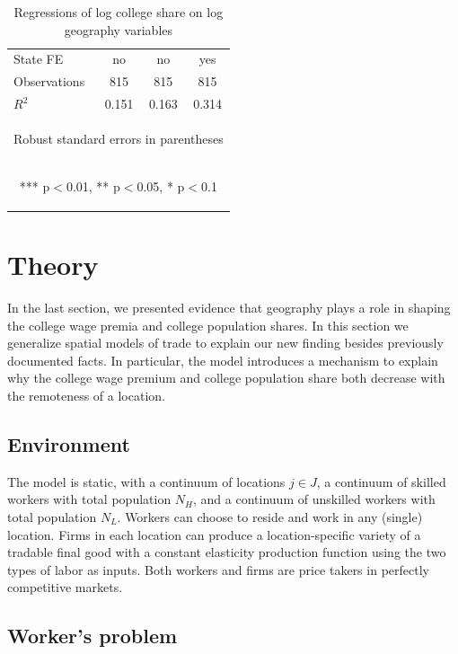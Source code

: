 \documentclass[12 pt]{article}
\begin{document}
\begin{table}
\begin{tabular}{lccc}
    State FE & \mbox{no} & \mbox{no} & \mbox{yes} \\
    Observations & 815 & 815 & 815 \\
     $R^2$ & 0.151 & 0.163 & 0.314 \\ \hline
    \multicolumn{4}{c}{\begin{footnotesize} Robust standard errors in parentheses\end{footnotesize}} \\
    \multicolumn{4}{c}{\begin{footnotesize} *** p$<$0.01, ** p$<$0.05, * p$<$0.1\end{footnotesize}} \\
    \end{tabular}
   \caption{Regressions of log college share on log geography variables}
    \label{tab:col_reg}
\end{table}

\section{Theory}
In the last section, we presented evidence that geography plays a role in shaping the college wage premia and college population shares. In this section we generalize spatial models of trade to explain our new finding besides previously documented facts. In particular, the model introduces a mechanism to explain why the college wage premium and college population share both decrease with the remoteness of a location.

\subsection{Environment}

The model is static, with a continuum of locations $j \in J$, a continuum of skilled workers with total population $N_H$, and a continuum of unskilled workers with total population $N_L$.  Workers can choose to reside and work in any (single) location.  Firms in each location can produce a location-specific variety of a tradable final good with a constant elasticity production function using the two types of labor as inputs. Both workers and firms are price takers in perfectly competitive markets.

\subsection{Worker's problem}
\end{document}
